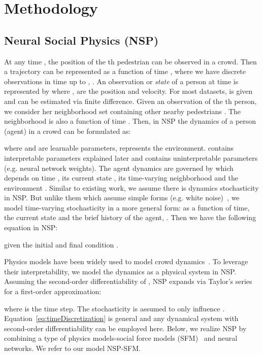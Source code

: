 \documentclass[runningheads]{llncs}
\newcommand{\Eqnref}[1]{Equation~\ref{eq:#1}}
\begin{document}
\section{Methodology}


\subsection{Neural Social Physics (NSP)}

At any time , the position  of the th pedestrian can be observed in a crowd. Then a trajectory can be represented as a function of time , where we have discrete observations in time up to , . An observation or \textit{state} of a person at time  is represented by  where ,  are the position and velocity. For most datasets,  is given and  can be estimated via finite difference. Given an observation  of the th person, we consider her neighborhood set  containing other nearby pedestrians . The neighborhood is also a function of time . Then, in NSP the dynamics of a person (agent) in a crowd can be formulated as:

where  and  are learnable parameters,  represents the environment.  contains interpretable parameters explained later and  contains uninterpretable parameters (e.g. neural network weights). The agent dynamics are governed by  which depends on time , its current state , its time-varying neighborhood  and the environment . Similar to existing work, we assume there is dynamics stochasticity in NSP. But unlike them which assume simple forms (e.g. white noise)~\cite{He_Informative_2020}, we model time-varying stochasticity in a more general form: as a function of time, the current state and the brief history of the agent, . Then we have the following equation in NSP:

given the initial and final condition .

Physics models have been widely used to model crowd dynamics~\cite{narain2009aggregate,helbing1995social}. To leverage their interpretability, we model the dynamics as a physical system in NSP. Assuming the second-order differentiability of , NSP expands  via Taylor's series for a first-order approximation:

where  is the time step. The stochasticity  is assumed to only influence . \Eqnref{timeDiscretization} is general and any dynamical system with second-order differentiability can be employed here. Below, we realize NSP by combining a type of physics models-social force models (SFM)~\cite{helbing1995social} and neural networks. We refer to our model NSP-SFM.
\end{document}
